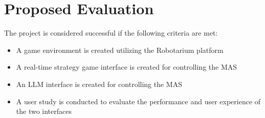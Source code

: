 \section{Proposed Evaluation}

The project is considered successful if the following criteria are met:
\begin{itemize}[noitemsep, topsep=0pt]
    \item A game environment is created utilizing the Robotarium platform
    \item A real-time strategy game interface is created for controlling the MAS
    \item An LLM interface is created for controlling the MAS
    \item A user study is conducted to evaluate the performance and user experience of the two interfaces
\end{itemize}
